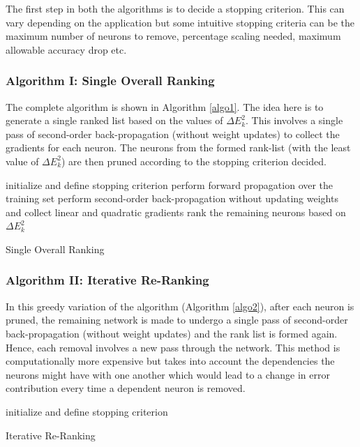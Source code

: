 The first step in both the algorithms is to  decide a stopping criterion. This can vary depending on the application but some intuitive stopping criteria can be the maximum number of neurons to remove, percentage scaling needed, maximum allowable accuracy drop etc. 

\subsubsection{Algorithm I: Single Overall Ranking}
The complete algorithm is shown in Algorithm \ref{algo1}. The idea here is to generate a single ranked list based on the values of $\Delta E_{k}^2$. This involves a single pass of second-order back-propagation (without weight updates) to collect the gradients for each neuron. The neurons from the formed rank-list (with the least value of $\Delta E_{k}^2$) are then pruned according to the stopping criterion decided.

\begin{algorithm}
 initialize and define stopping criterion \;
 perform forward propagation over the training set \;
  perform second-order back-propagation without updating weights and collect linear and quadratic gradients \;
  rank the remaining neurons based on $\Delta E_{k}^2$\;
 \caption{Single Overall Ranking}
 \label{algo1}
\end{algorithm}
 
\subsubsection{Algorithm II: Iterative Re-Ranking}

In this greedy variation of the algorithm (Algorithm \ref{algo2}), after each neuron is pruned, the remaining network is made to undergo a single pass of second-order back-propagation (without weight updates) and the rank list is formed again. Hence, each removal involves a new pass through the network. This method is computationally more expensive but takes into account the dependencies the neurons might have with one another which would lead to a change in error contribution every time a dependent neuron is removed. 

\begin{algorithm}
 initialize and define stopping criterion \;
 \caption{Iterative Re-Ranking}
 \label{algo2}
\end{algorithm}
